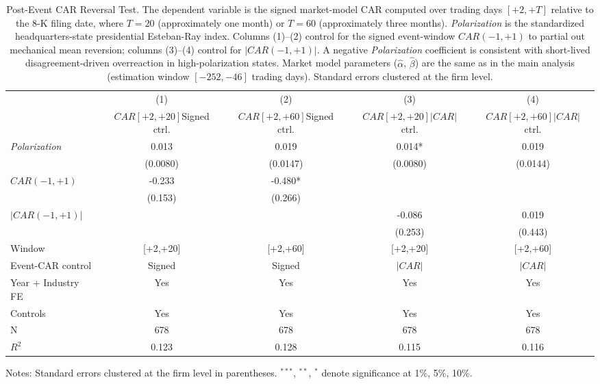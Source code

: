 \begin{table}[htbp]
\centering
\caption{Post-Event CAR Reversal Test. The dependent variable is the signed market-model CAR computed over trading days $[+2,+T]$ relative to the 8-K filing date, where $T=20$ (approximately one month) or $T=60$ (approximately three months). \textit{Polarization} is the standardized headquarters-state presidential Esteban-Ray index. Columns (1)--(2) control for the signed event-window $CAR(-1,+1)$ to partial out mechanical mean reversion; columns (3)--(4) control for $|CAR(-1,+1)|$. A negative \textit{Polarization} coefficient is consistent with short-lived disagreement-driven overreaction in high-polarization states. Market model parameters ($\hat\alpha$, $\hat\beta$) are the same as in the main analysis (estimation window $[-252,-46]$ trading days). Standard errors clustered at the firm level.}
\label{tab:reversal}
\begin{tabular}{lcccc}
\toprule
 & (1) & (2) & (3) & (4) \\
 & $CAR[+2,+20]$\newline Signed ctrl. & $CAR[+2,+60]$\newline Signed ctrl. & $CAR[+2,+20]$\newline $|CAR|$ ctrl. & $CAR[+2,+60]$\newline $|CAR|$ ctrl. \\
\midrule
\textit{Polarization} & 0.013 & 0.019 & 0.014* & 0.019 \\
 & (0.0080) & (0.0147) & (0.0080) & (0.0144) \\
$CAR(-1,+1)$ & -0.233 & -0.480* &  &  \\
 & (0.153) & (0.266) &  &  \\
$|CAR(-1,+1)|$ &  &  & -0.086 & 0.019 \\
 &  &  & (0.253) & (0.443) \\
\midrule
Window & [+2,+20] & [+2,+60] & [+2,+20] & [+2,+60] \\
Event-CAR control & Signed & Signed & $|CAR|$ & $|CAR|$ \\
Year + Industry FE & Yes & Yes & Yes & Yes \\
Controls & Yes & Yes & Yes & Yes \\
N & 678 & 678 & 678 & 678 \\
$R^2$ & 0.123 & 0.128 & 0.115 & 0.116 \\
\bottomrule
\end{tabular}
\begin{flushleft}
\footnotesize Notes: Standard errors clustered at the firm level in parentheses. $^{***}$, $^{**}$, $^{*}$ denote significance at 1\%, 5\%, 10\%.
\end{flushleft}
\end{table}